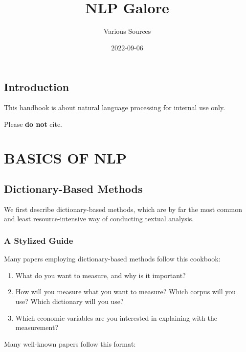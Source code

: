 \documentclass[
]{book}
\title{NLP Galore}
\author{Various Sources}
\date{2022-09-06}
\providecommand{\tightlist}{%
  \setlength{\itemsep}{0pt}\setlength{\parskip}{0pt}}
\begin{document}
\maketitle

{
\setcounter{tocdepth}{1}
\tableofcontents
}
\hypertarget{introduction}{%
\chapter{Introduction}\label{introduction}}

This handbook is about natural language processing for internal use only.

Please \textbf{do not} cite.

\hypertarget{part-basics-of-nlp}{%
\part*{BASICS OF NLP}\label{part-basics-of-nlp}}

\hypertarget{dictionary-based-methods}{%
\chapter{Dictionary-Based Methods}\label{dictionary-based-methods}}

We first describe dictionary-based methods, which are by far the most common and least resource-intensive way of conducting textual analysis.

\hypertarget{a-stylized-guide}{%
\section{A Stylized Guide}\label{a-stylized-guide}}

Many papers employing dictionary-based methods follow this cookbook:

\begin{enumerate}
\def\labelenumi{\arabic{enumi}.}
\tightlist
\item
  What do you want to measure, and why is it important?
\item
  How will you measure what you want to measure? Which corpus will you use? Which dictionary will you use?
\item
  Which economic variables are you interested in explaining with the measurement?
\end{enumerate}

Many well-known papers follow this format:
\end{document}
